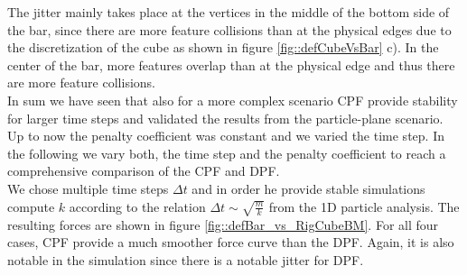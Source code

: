The jitter mainly takes place at the vertices in the middle of the bottom side of the bar, since there are more feature collisions than at the physical edges due to the discretization of the cube as shown in figure \ref{fig::defCubeVsBar} c).
In the center of the bar, more features overlap than at the physical edge and thus there are more feature collisions.\\
In sum we have seen that also for a more complex scenario CPF provide stability for larger time steps and validated the results from the particle-plane scenario.\\
Up to now the penalty coefficient was constant and we varied the time step.
In the following we vary both, the time step and the penalty coefficient to reach a comprehensive comparison of the CPF and DPF.\\
We chose multiple time steps $\Delta t$ and in order he provide stable simulations compute $k$ according to the relation $\Delta t \sim \sqrt{\frac{m}{k}}$ from the 1D particle analysis. 
The resulting forces are shown in figure \ref{fig::defBar_vs_RigCubeBM}.
For all four cases, CPF provide a much smoother force curve than the DPF. Again, it is also notable in the simulation since there is a notable jitter for DPF.\\ 
